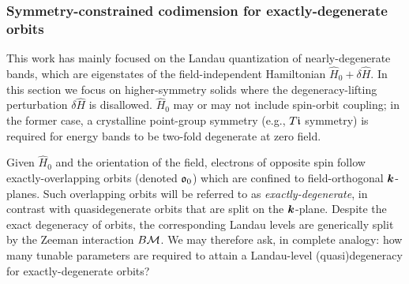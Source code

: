 \documentclass[aps, prb, showpacs, twocolumn, notitlepage, superscriptaddress]{revtex4-1}
\begin{document}


\subsubsection{Symmetry-constrained codimension for exactly-degenerate orbits}\label{sec:codimexactdeg}

This work has mainly focused on the Landau quantization of nearly-degenerate bands, which are eigenstates of the field-independent Hamiltonian $\hat{H}_0{+}\delta \hat{H}$. In this section we focus on higher-symmetry solids where the degeneracy-lifting perturbation $\delta \hat{H}$ is disallowed. $\hat{H}_0$ may or may not include spin-orbit coupling; in the former case, a crystalline point-group symmetry (e.g., $T\mathfrak{i}$ symmetry) is required for energy bands to be two-fold degenerate at zero field.

Given $\hat{H}_0$ and the orientation of the field, electrons of opposite spin follow exactly-overlapping orbits (denoted $\mathfrak{o}_0$) which are confined to field-orthogonal $\boldsymbol{k}$-planes. Such overlapping orbits will be referred to as \textit{exactly-degenerate}, in contrast with quasidegenerate orbits that are split on the $\boldsymbol{k}$-plane. Despite the exact degeneracy of orbits, the corresponding Landau levels are generically split by the Zeeman interaction $B{\cal M}$. We may therefore ask, in complete analogy: how many tunable parameters are required to attain a Landau-level (quasi)degeneracy for exactly-degenerate orbits? 
\end{document}
